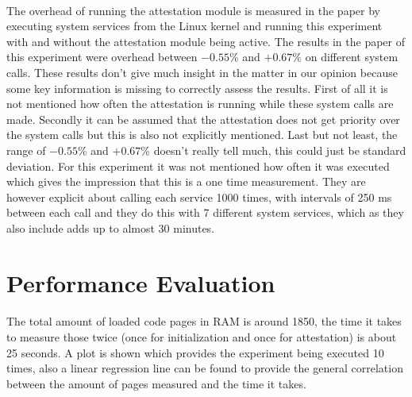 \paragraph*{}%
The overhead of running the attestation module is measured in the paper by executing system services from the Linux kernel and running this experiment with and without the attestation module being active. The results in the paper of this experiment were overhead between $- 0.55 \%$ and $+ 0.67 \%$ on different system calls. These results don't give much insight in the matter in our opinion because some key information is missing to correctly assess the results. First of all it is not mentioned how often the attestation is running while these system calls are made. Secondly it can be assumed that the attestation does not get priority over the system calls but this is also not explicitly mentioned. Last but not least, the range of $- 0.55 \%$ and $+ 0.67 \%$ doesn't really tell much, this could just be standard deviation. For this experiment it was not mentioned how often it was executed which gives the impression that this is a one time measurement. They are however explicit about calling each service 1000 times, with intervals of 250 ms between each call and they do this with 7 different system services, which as they also include adds up to almost 30 minutes.

\section{Performance Evaluation}

\paragraph*{}%
The total amount of loaded code pages in RAM is around 1850, the time it takes to measure those twice (once for initialization and once for attestation) is about 25 seconds. A plot is shown which provides the experiment being executed 10 times, also a linear regression line can be found to provide the general correlation between the amount of pages measured and the time it takes.


